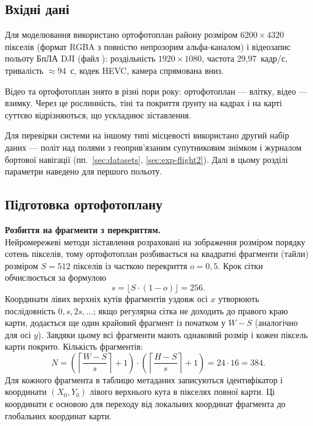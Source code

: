 \documentclass[a4paper, 12pt, titlepage]{article}
\begin{document}
\subsection{Вхідні дані}

Для моделювання використано ортофотоплан району розміром $6200 \times 4320$ пікселів (формат RGBA з повністю непрозорим альфа-каналом) і відеозапис польоту БпЛА DJI (файл ): роздільність $1920 \times 1080$, частота 29,97~кадр/с, тривалість $\approx 94$~с, кодек HEVC, камера спрямована вниз.

Відео та ортофотоплан знято в різні пори року: ортофотоплан --- влітку, відео --- взимку. Через це рослинність, тіні та покриття ґрунту на кадрах і на карті суттєво відрізняються, що ускладнює зіставлення.

Для перевірки системи на іншому типі місцевості використано другий набір даних --- політ над полями з геоприв'язаним супутниковим знімком і журналом бортової навігації (пп.~\ref{sec:datasets}, \ref{sec:exp-flight2}). Далі в цьому розділі параметри наведено для першого польоту.

\subsection{Підготовка ортофотоплану}

\textbf{Розбиття на фрагменти з перекриттям.}\\
Нейромережеві методи зіставлення розраховані на зображення розміром порядку сотень пікселів, тому ортофотоплан розбивається на квадратні фрагменти (тайли) розміром $S = 512$ пікселів із часткою перекриття $o = 0{,}5$. Крок сітки обчислюється за формулою
\begin{equation}
s = \lfloor S \cdot (1 - o) \rfloor = 256 .
\end{equation}
Координати лівих верхніх кутів фрагментів уздовж осі $x$ утворюють послідовність $0, s, 2s, \dots$; якщо регулярна сітка не доходить до правого краю карти, додається ще один крайовий фрагмент із початком у $W - S$ (аналогічно для осі $y$). Завдяки цьому всі фрагменти мають однаковий розмір і кожен піксель карти покрито. Кількість фрагментів:
\begin{equation}
N = \left( \left\lceil \frac{W - S}{s} \right\rceil + 1 \right) \cdot \left( \left\lceil \frac{H - S}{s} \right\rceil + 1 \right) = 24 \cdot 16 = 384 .
\end{equation}
Для кожного фрагмента в таблицю метаданих  записуються ідентифікатор і координати $(X_0, Y_0)$ лівого верхнього кута в пікселях повної карти. Ці координати є основою для переходу від локальних координат фрагмента до глобальних координат карти.
\end{document}
